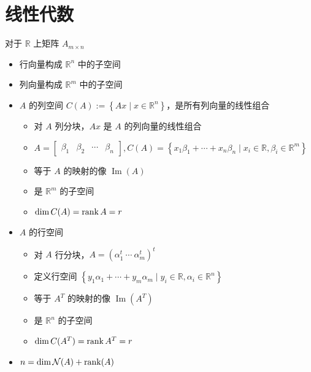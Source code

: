 \section{线性代数}
\begin{remark}
    对于 $\mathbb{R}$ 上矩阵 $A_{m \times n}$
    \begin{itemize}
        \item 行向量构成 $\mathbb{R}^n$ 中的子空间
        \item 列向量构成 $\mathbb{R}^m$ 中的子空间
        \item $A$ 的列空间 $C(A) := \left\{Ax \mid x \in \mathbb{R}^n\right\}$，是所有列向量的线性组合\begin{itemize}
            \item 对 $A$ 列分块，$Ax$ 是 $A$ 的列向量的线性组合
            \item $A=\begin{bmatrix}
                \beta_{1} & \beta_{2} & \cdots & \beta_{n}
            \end{bmatrix}, C(A)=\left\{x_{1} \beta_{1}+\cdots + x_{n} \beta_{n} \mid x_{i} \in \mathbb{R}, \beta_i \in \mathbb{R}^m\right\}$
            \item 等于 $A$ 的映射的像 $\operatorname{Im}(A)$
            \item 是 $\mathbb{R}^m$ 的子空间
            \item $\dim C(A) = \rank A = r$
        \end{itemize}
        \item $A$ 的行空间\begin{itemize}
            \item 对 $A$ 行分块，$A = (\alpha_1^t\ \cdots\  \alpha_m^t)^t$
            \item 定义行空间 $\left\{y_1\alpha_1 + \cdots + y_m\alpha_m \mid y_i \in \mathbb{R}, \alpha_i \in \mathbb{R}^n\right\}$
            \item 等于 $A^T$ 的映射的像 $\operatorname{Im}(A^T)$
            \item 是 $\mathbb{R}^n$ 的子空间
            \item $\dim C(A^T) = \rank A^T = r$
        \end{itemize}
        \item $n = \dim \mathcal{N}(A) + \rank(A)$
    \end{itemize}
\end{remark}


